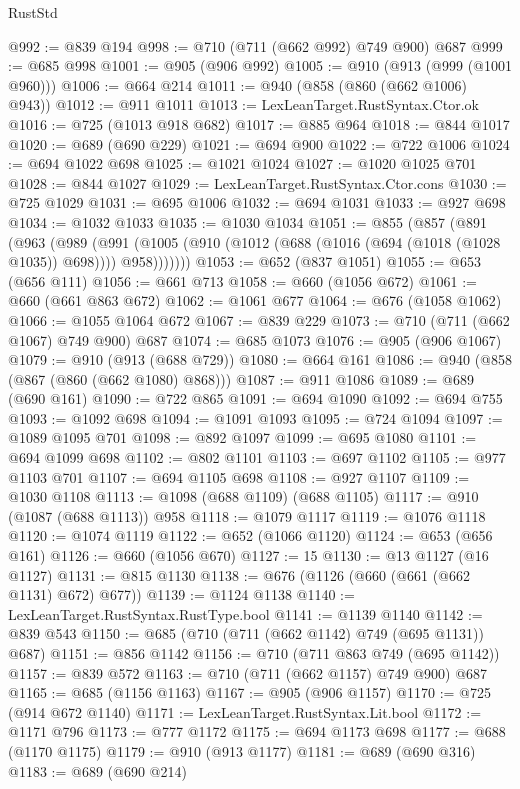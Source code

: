\begin{lexlean}{RustStd}
\begin{coremodule}
{\begin{coremodule}
{{{{{{{{{{{{{{{{{{{{@992 := @839 @194
@998 := @710 (@711 (@662 @992) @749 @900) @687
@999 := @685 @998
@1001 := @905 (@906 @992)
@1005 := @910 (@913 (@999 (@1001 @960)))
@1006 := @664 @214
@1011 := @940 (@858 (@860 (@662 @1006) @943))
@1012 := @911 @1011
@1013 := LexLeanTarget.RustSyntax.Ctor.ok
@1016 := @725 (@1013 @918 @682)
@1017 := @885 @964
@1018 := @844 @1017
@1020 := @689 (@690 @229)
@1021 := @694 @900
@1022 := @722 @1006
@1024 := @694 @1022 @698
@1025 := @1021 @1024
@1027 := @1020 @1025 @701
@1028 := @844 @1027
@1029 := LexLeanTarget.RustSyntax.Ctor.cons
@1030 := @725 @1029
@1031 := @695 @1006
@1032 := @694 @1031
@1033 := @927 @698
@1034 := @1032 @1033
@1035 := @1030 @1034
@1051 := @855
    (@857
      (@891
        (@963
          (@989
            (@991 (@1005 (@910 (@1012 (@688 (@1016 (@694 (@1018 (@1028 @1035)) @698)))) @958)))))))
@1053 := @652 (@837 @1051)
@1055 := @653 (@656 @111)
@1056 := @661 @713
@1058 := @660 (@1056 @672)
@1061 := @660 (@661 @863 @672)
@1062 := @1061 @677
@1064 := @676 (@1058 @1062)
@1066 := @1055 @1064 @672
@1067 := @839 @229
@1073 := @710 (@711 (@662 @1067) @749 @900) @687
@1074 := @685 @1073
@1076 := @905 (@906 @1067)
@1079 := @910 (@913 (@688 @729))
@1080 := @664 @161
@1086 := @940 (@858 (@867 (@860 (@662 @1080) @868)))
@1087 := @911 @1086
@1089 := @689 (@690 @161)
@1090 := @722 @865
@1091 := @694 @1090
@1092 := @694 @755
@1093 := @1092 @698
@1094 := @1091 @1093
@1095 := @724 @1094
@1097 := @1089 @1095 @701
@1098 := @892 @1097
@1099 := @695 @1080
@1101 := @694 @1099 @698
@1102 := @802 @1101
@1103 := @697 @1102
@1105 := @977 @1103 @701
@1107 := @694 @1105 @698
@1108 := @927 @1107
@1109 := @1030 @1108
@1113 := @1098 (@688 @1109) (@688 @1105)
@1117 := @910 (@1087 (@688 @1113)) @958
@1118 := @1079 @1117
@1119 := @1076 @1118
@1120 := @1074 @1119
@1122 := @652 (@1066 @1120)
@1124 := @653 (@656 @161)
@1126 := @660 (@1056 @670)
@1127 := 15
@1130 := @13 @1127 (@16 @1127)
@1131 := @815 @1130
@1138 := @676 (@1126 (@660 (@661 (@662 @1131) @672) @677))
@1139 := @1124 @1138
@1140 := LexLeanTarget.RustSyntax.RustType.bool
@1141 := @1139 @1140
@1142 := @839 @543
@1150 := @685 (@710 (@711 (@662 @1142) @749 (@695 @1131)) @687)
@1151 := @856 @1142
@1156 := @710 (@711 @863 @749 (@695 @1142))
@1157 := @839 @572
@1163 := @710 (@711 (@662 @1157) @749 @900) @687
@1165 := @685 (@1156 @1163)
@1167 := @905 (@906 @1157)
@1170 := @725 (@914 @672 @1140)
@1171 := LexLeanTarget.RustSyntax.Lit.bool
@1172 := @1171 @796
@1173 := @777 @1172
@1175 := @694 @1173 @698
@1177 := @688 (@1170 @1175)
@1179 := @910 (@913 @1177)
@1181 := @689 (@690 @316)
@1183 := @689 (@690 @214)
}}}}}}}}}}}}}}}}}}}}
\end{coremodule}}
\end{coremodule}
\end{lexlean}
